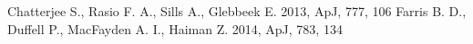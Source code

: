 \documentclass{aastex62}
\begin{document}
\begin{thebibliography}{}

 Chatterjee S., Rasio F. A., Sills A., Glebbeek E. 2013, ApJ, 777, 106  
 Farris B. D., Duffell P., MacFayden A. I., Haiman Z. 2014, ApJ, 783, 134 

\end{thebibliography}
\end{document}

